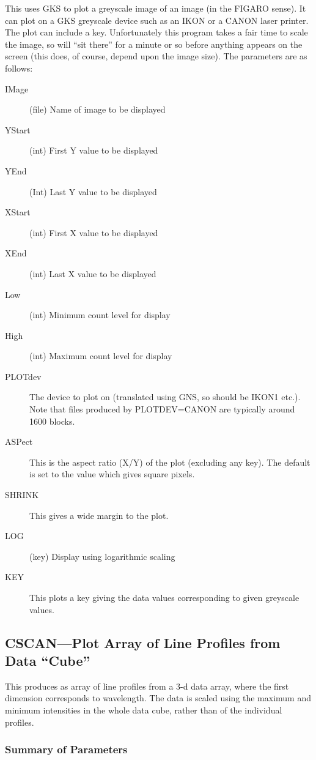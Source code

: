 This uses GKS to plot a greyscale image of an image (in the FIGARO
sense). It can plot on a GKS greyscale device such as an IKON or a CANON
laser printer.
The plot can include a key. Unfortunately this
program takes a fair time to scale the image, so will ``sit there''
for a minute or so before anything appears on the screen (this does, of
course, depend upon the image size). The parameters are as follows:
\begin{description}
\item[IMage] (file) Name of image to be displayed 
\item[YStart] (int) First Y value to be displayed 
\item[YEnd] (Int) Last Y value to be displayed 
\item[XStart] (int) First X value to be displayed 
\item[XEnd] (int) Last X value to be displayed 
\item[Low] (int) Minimum count level for display 
\item[High] (int) Maximum count level for display 
\item[PLOTdev] The device to plot on (translated using GNS, so
should be IKON1 etc.). Note that files produced by PLOTDEV=CANON are
typically around 1600 blocks.
\item[ASPect] This is the aspect ratio (X/Y) of the plot (excluding
any key). The default is set to the value which gives square pixels.
\item[SHRINK] This gives a wide margin to the plot.
\item[LOG] (key) Display using logarithmic scaling 
\item[KEY] This plots a key giving the data values corresponding to
given greyscale values.
\end{description}

\subsection{CSCAN---Plot Array of Line Profiles from Data ``Cube''}

This produces as array of line profiles from a 3-d data array, where
the first dimension corresponds to wavelength. The data is scaled using
the maximum and minimum intensities in the whole data cube, rather than
of the individual profiles.

\subsubsection{Summary of Parameters}


